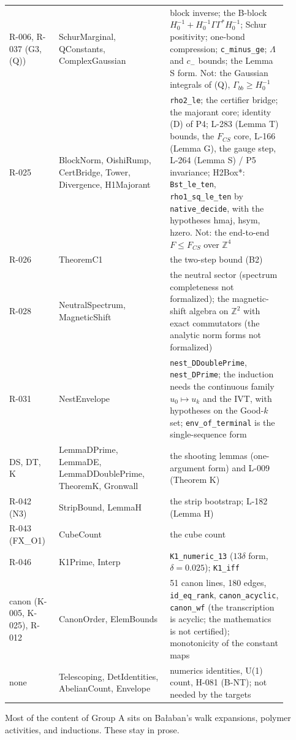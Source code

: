 {\begin{longtable}{p{0.16\linewidth}p{0.36\linewidth}p{0.38\linewidth}}
R-006, R-037 (G3, (Q)) & SchurMarginal, QConstants, ComplexGaussian & block inverse; the B-block $H_0^{-1}+H_0^{-1}\Gamma\Gamma^*H_0^{-1}$; Schur positivity; one-bond compression; \texttt{c\_minus\_ge}; $\Lambda$ and $c_-$ bounds; the Lemma S form. Not: the Gaussian integrals of (Q), $\Gamma_{bb}\ge H_0^{-1}$ \\
R-025 & BlockNorm, OishiRump, CertBridge, Tower, Divergence, H1Majorant & \texttt{rho2\_le}; the certifier bridge; the majorant core; identity (D) of P4; L-283 (Lemma T) bounds, the $F_{CS}$ core, L-166 (Lemma G), the gauge step, L-264 (Lemma S) / P5 invariance; H2Box*: \texttt{Bst\_le\_ten}, \texttt{rho1\_sq\_le\_ten} by \texttt{native\_decide}, with the hypotheses hmaj, hsym, hzero. Not: the end-to-end $F\le F_{CS}$ over $\mathbb Z^4$ \\
R-026 & TheoremC1 & the two-step bound (B2) \\
R-028 & NeutralSpectrum, MagneticShift & the neutral sector (spectrum completeness not formalized); the magnetic-shift algebra on $\mathbb Z^2$ with exact commutators (the analytic norm forms not formalized) \\
R-031 & NestEnvelope & \texttt{nest\_DDoublePrime}, \texttt{nest\_DPrime}; the induction needs the continuous family $u_0\mapsto u_k$ and the IVT, with hypotheses on the Good-$k$ set; \texttt{env\_of\_terminal} is the single-sequence form \\
DS, DT, K & LemmaDPrime, LemmaDE, LemmaDDoublePrime, TheoremK, Gronwall & the shooting lemmas (one-argument form) and L-009 (Theorem K) \\
R-042 (N3) & StripBound, LemmaH & the strip bootstrap; L-182 (Lemma H) \\
R-043 (FX\_O1) & CubeCount & the cube count \\
R-046 & K1Prime, Interp & \texttt{K1\_numeric\_13} ($13\delta$ form, $\delta=0.025$); \texttt{K1\_iff} \\
canon (K-005, K-025), R-012 & CanonOrder, ElemBounds & 51 canon lines, 180 edges, \texttt{id\_eq\_rank}, \texttt{canon\_acyclic}, \texttt{canon\_wf} (the transcription is acyclic; the mathematics is not certified); monotonicity of the constant maps \\
none & Telescoping, DetIdentities, AbelianCount, Envelope & numerics identities, U(1) count, H-081 (B-NT); not needed by the targets \\ \hline
\end{longtable}}
\noindent Most of the content of Group A sits on Ba{\l}aban's walk expansions, polymer activities, and inductions. These stay in prose.
